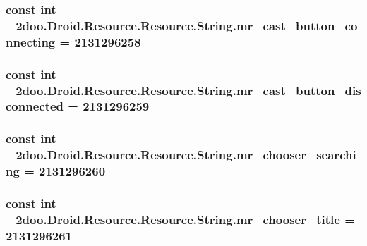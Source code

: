 \hypertarget{class__2doo_1_1_droid_1_1_resource_1_1_string_f89090459007e0da1115f4fce1f7c160}{
\subsubsection[{mr\_\-cast\_\-button\_\-connecting}]{\setlength{\rightskip}{0pt plus 5cm}const int \_\-2doo.Droid.Resource.Resource.String.mr\_\-cast\_\-button\_\-connecting = 2131296258}}
\label{class__2doo_1_1_droid_1_1_resource_1_1_string_f89090459007e0da1115f4fce1f7c160}


\hypertarget{class__2doo_1_1_droid_1_1_resource_1_1_string_7caf03d52ca3a4ab732426e2eb58d03b}{
\subsubsection[{mr\_\-cast\_\-button\_\-disconnected}]{\setlength{\rightskip}{0pt plus 5cm}const int \_\-2doo.Droid.Resource.Resource.String.mr\_\-cast\_\-button\_\-disconnected = 2131296259}}
\label{class__2doo_1_1_droid_1_1_resource_1_1_string_7caf03d52ca3a4ab732426e2eb58d03b}


\hypertarget{class__2doo_1_1_droid_1_1_resource_1_1_string_4de51dc2e544afbb35041c45d8573bda}{
\subsubsection[{mr\_\-chooser\_\-searching}]{\setlength{\rightskip}{0pt plus 5cm}const int \_\-2doo.Droid.Resource.Resource.String.mr\_\-chooser\_\-searching = 2131296260}}
\label{class__2doo_1_1_droid_1_1_resource_1_1_string_4de51dc2e544afbb35041c45d8573bda}


\hypertarget{class__2doo_1_1_droid_1_1_resource_1_1_string_5432bb85813a050c2f57be7056ce096a}{
\subsubsection[{mr\_\-chooser\_\-title}]{\setlength{\rightskip}{0pt plus 5cm}const int \_\-2doo.Droid.Resource.Resource.String.mr\_\-chooser\_\-title = 2131296261}}
\label{class__2doo_1_1_droid_1_1_resource_1_1_string_5432bb85813a050c2f57be7056ce096a}


